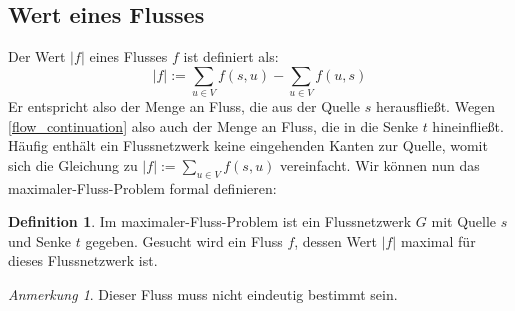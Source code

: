 \documentclass[12pt,a4paper,titlepage,onecolumn,ngerman,bibliography=totocnumbered]{scrartcl}
\theoremstyle{definition}
\newtheorem*{definition}{Definition}
\theoremstyle{remark}
\newtheorem*{remark}{Anmerkung}
\begin{document}
\subsection{Wert eines Flusses}
Der Wert $\lvert f \rvert$ eines Flusses $f$ ist definiert als:
\begin{equation}\label{flow_value}
	\lvert f \rvert := \sum_{u\in V} f(s,u) - \sum_{u\in V} f(u,s)
\end{equation}
Er entspricht also der Menge an Fluss, die aus der Quelle $s$ herausfließt.
Wegen \eqref{flow_continuation} also auch der Menge an Fluss, die in die Senke $t$ hineinfließt.
Häufig enthält ein Flussnetzwerk keine eingehenden Kanten zur Quelle, womit sich die Gleichung zu $\lvert f \rvert := \sum_{u\in V} f(s,u)$ vereinfacht.
Wir können nun das maximaler-Fluss-Problem formal definieren:

\begin{definition}
	Im maximaler-Fluss-Problem ist ein Flussnetzwerk $G$ mit Quelle $s$ und Senke $t$ gegeben.
	Gesucht wird ein Fluss $f$, dessen Wert $\lvert f\rvert$ maximal für dieses Flussnetzwerk ist.
\end{definition}
\begin{remark}
	Dieser Fluss muss nicht eindeutig bestimmt sein. %
\end{remark}
\end{document}
